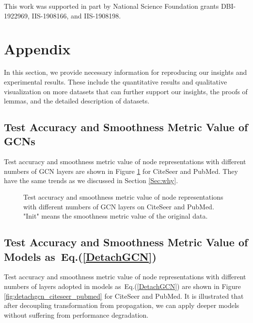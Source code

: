 \documentclass[sigconf]{acmart}
\begin{document}
\begin{acks}
    This work was supported in part by National Science Foundation grants DBI-1922969, IIS-1908166, and IIS-1908198.
\end{acks}


\balance


\appendix

\clearpage

\section{Appendix}
In this section, we provide necessary information for reproducing our insights and experimental results. These include the quantitative results and qualitative visualization on more datasets that can further support our insights, the proofs of lemmas, and the detailed description of datasets.

\subsection{Test Accuracy and Smoothness Metric Value of GCNs}\label{Sec:acc_gcn}

Test accuracy and smoothness metric value of node representations with different numbers of GCN layers are shown in Figure \ref{fig:gcn_degrade_citeseer_pubmed} for CiteSeer and PubMed. They have the same trends as we discussed in Section \ref{Sec:why}.


\begin{figure}[h]
\centering
{}
\caption{Test accuracy and smoothness metric value of node representations with different numbers of GCN layers on CiteSeer and PubMed. "Init" means the smoothness metric value of the original data.}
\label{fig:gcn_degrade_citeseer_pubmed}
\end{figure}


\subsection{Test Accuracy and Smoothness Metric Value of Models as~Eq.(\ref{DetachGCN})}\label{Sec:detachgcn_app}
Test accuracy and smoothness metric value of node representations with different numbers of layers adopted in models as~Eq.(\ref{DetachGCN}) are shown in Figure \ref{fig:detachgcn_citeseer_pubmed} for CiteSeer and PubMed. It is illustrated that after decoupling transformation from propagation, we can apply deeper models without suffering from performance degradation.
\end{document}
